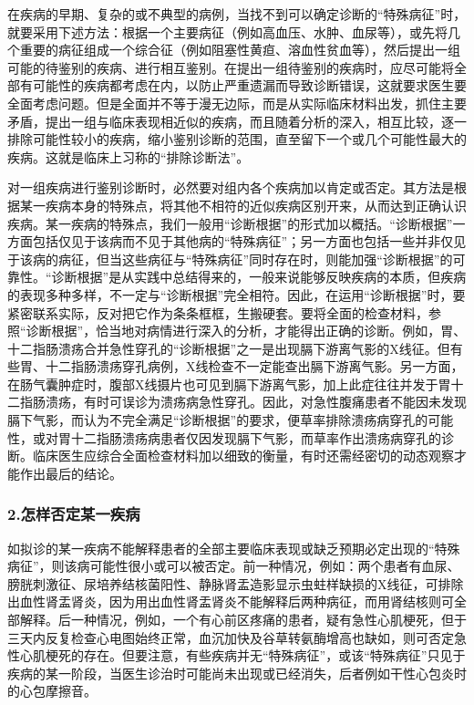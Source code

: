 在疾病的早期、复杂的或不典型的病例，当找不到可以确定诊断的“特殊病征”时，就要采用下述方法：根据一个主要病征（例如高血压、水肿、血尿等），或先将几个重要的病征组成一个综合征（例如阻塞性黄疸、溶血性贫血等），然后提出一组可能的待鉴别的疾病、进行相互鉴别。在提出一组待鉴别的疾病时，应尽可能将全部有可能性的疾病都考虑在内，以防止严重遗漏而导致诊断错误，这就要求医生要全面考虑问题。但是全面并不等于漫无边际，而是从实际临床材料出发，抓住主要矛盾，提出一组与临床表现相近似的疾病，而且随着分析的深入，相互比较，逐一排除可能性较小的疾病，缩小鉴别诊断的范围，直至留下一个或几个可能性最大的疾病。这就是临床上习称的“排除诊断法”。

对一组疾病进行鉴别诊断时，必然要对组内各个疾病加以肯定或否定。其方法是根据某一疾病本身的特殊点，将其他不相符的近似疾病区别开来，从而达到正确认识疾病。某一疾病的特殊点，我们一般用“诊断根据”的形式加以概括。“诊断根据”一方面包括仅见于该病而不见于其他病的“特殊病征”；另一方面也包括一些并非仅见于该病的病征，但当这些病征与“特殊病征”同时存在时，则能加强“诊断根据”的可靠性。“诊断根据”是从实践中总结得来的，一般来说能够反映疾病的本质，但疾病的表现多种多样，不一定与“诊断根据”完全相符。因此，在运用“诊断根据”时，要紧密联系实际，反对把它作为条条框框，生搬硬套。要将全面的检查材料，参照“诊断根据”，恰当地对病情进行深入的分析，才能得出正确的诊断。例如，胃、十二指肠溃疡合并急性穿孔的“诊断根据”之一是出现膈下游离气影的X线征。但有些胃、十二指肠溃疡穿孔病例，X线检查不一定能查出膈下游离气影。另一方面，在肠气囊肿症时，腹部X线摄片也可见到膈下游离气影，加上此症往往并发于胃十二指肠溃疡，有时可误诊为溃疡病急性穿孔。因此，对急性腹痛患者不能因未发现膈下气影，而认为不完全满足“诊断根据”的要求，便草率排除溃疡病穿孔的可能性，或对胃十二指肠溃疡病患者仅因发现膈下气影，而草率作出溃疡病穿孔的诊断。临床医生应综合全面检查材料加以细致的衡量，有时还需经密切的动态观察才能作出最后的结论。

\subsubsection{2.怎样否定某一疾病}

如拟诊的某一疾病不能解释患者的全部主要临床表现或缺乏预期必定出现的“特殊病征”，则该病可能性很小或可以被否定。前一种情况，例如：两个患者有血尿、膀胱刺激征、尿培养结核菌阳性、静脉肾盂造影显示虫蛀样缺损的X线征，可排除出血性肾盂肾炎，因为用出血性肾盂肾炎不能解释后两种病征，而用肾结核则可全部解释。后一种情况，例如，一个有心前区疼痛的患者，疑有急性心肌梗死，但于三天内反复检查心电图始终正常，血沉加快及谷草转氨酶增高也缺如，则可否定急性心肌梗死的存在。但要注意，有些疾病并无“特殊病征”，或该“特殊病征”只见于疾病的某一阶段，当医生诊治时可能尚未出现或已经消失，后者例如干性心包炎时的心包摩擦音。

